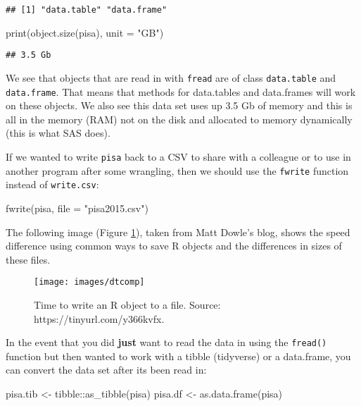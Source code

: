 \documentclass[
]{book}
\newenvironment{Shaded}{\begin{snugshade}}{\end{snugshade}}
\newcommand{\AttributeTok}[1]{\textcolor[rgb]{0.77,0.63,0.00}{#1}}
\newcommand{\FunctionTok}[1]{\textcolor[rgb]{0.00,0.00,0.00}{#1}}
\newcommand{\NormalTok}[1]{#1}
\newcommand{\OtherTok}[1]{\textcolor[rgb]{0.56,0.35,0.01}{#1}}
\newcommand{\SpecialCharTok}[1]{\textcolor[rgb]{0.00,0.00,0.00}{#1}}
\newcommand{\StringTok}[1]{\textcolor[rgb]{0.31,0.60,0.02}{#1}}
\begin{document}
\begin{verbatim}
## [1] "data.table" "data.frame"
\end{verbatim}

\begin{Shaded}
\begin{Highlighting}[]
\FunctionTok{print}\NormalTok{(}\FunctionTok{object.size}\NormalTok{(pisa), }\AttributeTok{unit =} \StringTok{"GB"}\NormalTok{)}
\end{Highlighting}
\end{Shaded}

\begin{verbatim}
## 3.5 Gb
\end{verbatim}

We see that objects that are read in with \texttt{fread} are of class \texttt{data.table} and \texttt{data.frame}. That means that methods for data.tables and data.frames will work on these objects. We also see this data set uses up 3.5 Gb of memory and this is all in the memory (RAM) not on the disk and allocated to memory dynamically (this is what SAS does).

If we wanted to write \texttt{pisa} back to a CSV to share with a colleague or to use in another program after some wrangling, then we should use the \texttt{fwrite} function instead of \texttt{write.csv}:

\begin{Shaded}
\begin{Highlighting}[]
\FunctionTok{fwrite}\NormalTok{(pisa, }\AttributeTok{file =} \StringTok{"pisa2015.csv"}\NormalTok{)}
\end{Highlighting}
\end{Shaded}

The following image (Figure \ref{fig:dtcomp}), taken from Matt Dowle's blog, shows the speed difference using common ways to save R objects and the differences in sizes of these files.

\begin{figure}
\texttt{[image: images/dtcomp]} \caption{Time to write an R object to a file. Source: https://tinyurl.com/y366kvfx.}\label{fig:dtcomp}
\end{figure}

In the event that you did \textbf{just} want to read the data in using the \texttt{fread()} function but then wanted to work with a tibble (tidyverse) or a data.frame, you can convert the data set after its been read in:

\begin{Shaded}
\begin{Highlighting}[]
\NormalTok{pisa.tib }\OtherTok{\textless{}{-}}\NormalTok{ tibble}\SpecialCharTok{::}\FunctionTok{as\_tibble}\NormalTok{(pisa)}
\NormalTok{pisa.df }\OtherTok{\textless{}{-}} \FunctionTok{as.data.frame}\NormalTok{(pisa)}
\end{Highlighting}
\end{Shaded}
\end{document}
